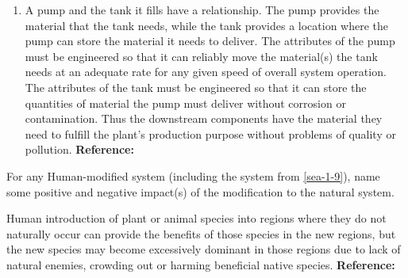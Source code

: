 \begin{exercises}
\begin{solution}
\begin{enumerate}[label=\alph*)]
            \item A pump and the tank it fills have a relationship. The pump provides the material that the tank needs, while the tank provides a location where the pump can store the material it needs to deliver. The attributes of the pump must be engineered so that it can reliably move the material(s) the tank needs at an adequate rate for any given speed of overall system operation. The attributes of the tank must be engineered so that it can store the quantities of material the pump must deliver without corrosion or contamination. Thus the downstream components have the material they need to fulfill the plant’s production purpose without problems of quality or pollution. \textbf{Reference:} 
        \end{enumerate}
    \end{solution}
    
    \begin{exercise} 
    \label{sea-1-14}
        For any Human-modified system (including the system from \ref{sea-1-9}), name some positive and negative impact(s) of the modification to the natural system.
    \end{exercise}
    \begin{solution}
        Human introduction of plant or animal species into regions where they do not naturally occur can provide the benefits of those species in the new regions, but the new species may become excessively dominant in those regions due to lack of natural enemies, crowding out or harming beneficial native species. \textbf{Reference:}
    \end{solution}
    

\end{exercises}
